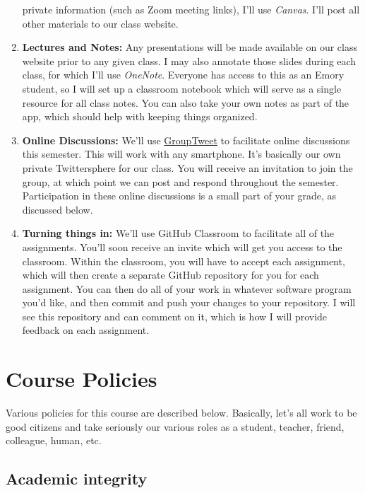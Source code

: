 \documentclass[11pt,]{article}
\begin{document}
\begin{enumerate}
  private information (such as Zoom meeting links), I'll use
  \emph{Canvas}. I'll post all other materials to our class website.
\item
  \textbf{Lectures and Notes:} Any presentations will be made available
  on our class website prior to any given class. I may also annotate
  those slides during each class, for which I'll use \emph{OneNote}.
  Everyone has access to this as an Emory student, so I will set up a
  classroom notebook which will serve as a single resource for all class
  notes. You can also take your own notes as part of the app, which
  should help with keeping things organized.
\item
  \textbf{Online Discussions:} We'll use
  \href{https://grouptweet.com/}{GroupTweet} to facilitate online
  discussions this semester. This will work with any smartphone. It's
  basically our own private Twittersphere for our class. You will
  receive an invitation to join the group, at which point we can post
  and respond throughout the semester. Participation in these online
  discussions is a small part of your grade, as discussed below.
\item
  \textbf{Turning things in:} We'll use GitHub Classroom to facilitate
  all of the assignments. You'll soon receive an invite which will get
  you access to the classroom. Within the classroom, you will have to
  accept each assignment, which will then create a separate GitHub
  repository for you for each assignment. You can then do all of your
  work in whatever software program you'd like, and then commit and push
  your changes to your repository. I will see this repository and can
  comment on it, which is how I will provide feedback on each
  assignment.
\end{enumerate}

\hypertarget{course-policies}{%
\section{Course Policies}\label{course-policies}}

Various policies for this course are described below. Basically, let's
all work to be good citizens and take seriously our various roles as a
student, teacher, friend, colleague, human, etc.

\hypertarget{academic-integrity}{%
\subsection{Academic integrity}\label{academic-integrity}}
\end{document}
